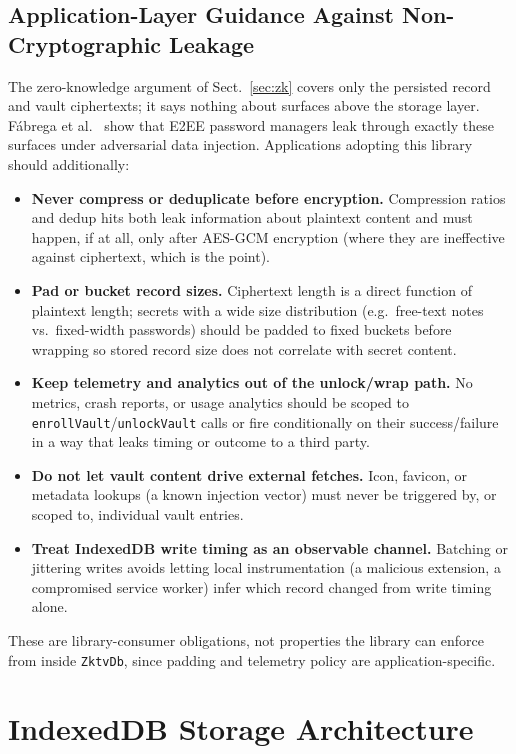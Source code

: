 \documentclass[runningheads]{llncs}
\begin{document}
\subsection{Application-Layer Guidance Against Non-Cryptographic Leakage}
\label{sec:applayer}
The zero-knowledge argument of Sect.~\ref{sec:zk} covers only the persisted record and vault ciphertexts; it says nothing about surfaces above the storage layer.
F\'{a}brega et al.~\cite{injection-attacks} show that E2EE password managers leak through exactly these surfaces under adversarial data injection.
Applications adopting this library should additionally:
\begin{itemize}
  \item \textbf{Never compress or deduplicate before encryption.} Compression ratios and dedup hits both leak information about plaintext content and must happen, if at all, only after AES-GCM encryption (where they are ineffective against ciphertext, which is the point).
  \item \textbf{Pad or bucket record sizes.} Ciphertext length is a direct function of plaintext length; secrets with a wide size distribution (e.g.\ free-text notes vs.\ fixed-width passwords) should be padded to fixed buckets before wrapping so stored record size does not correlate with secret content.
  \item \textbf{Keep telemetry and analytics out of the unlock/wrap path.} No metrics, crash reports, or usage analytics should be scoped to \texttt{enrollVault}\slash\texttt{unlockVault} calls or fire conditionally on their success/failure in a way that leaks timing or outcome to a third party.
  \item \textbf{Do not let vault content drive external fetches.} Icon, favicon, or metadata lookups (a known injection vector) must never be triggered by, or scoped to, individual vault entries.
  \item \textbf{Treat IndexedDB write timing as an observable channel.} Batching or jittering writes avoids letting local instrumentation (a malicious extension, a compromised service worker) infer which record changed from write timing alone.
\end{itemize}
These are library-consumer obligations, not properties the library can enforce from inside \texttt{ZktvDb}, since padding and telemetry policy are application-specific.

\section{IndexedDB Storage Architecture}
\label{sec:idb}
\end{document}
